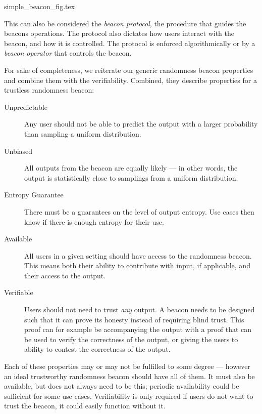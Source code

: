 {simple_beacon_fig.tex}

This can also be considered the \emph{beacon protocol}, the procedure that guides the beacons operations.
The protocol also dictates how users interact with the beacon, and how it is controlled.
The protocol is enforced algorithmically or by a \emph{beacon operator} that controls the beacon.

For sake of completeness, we reiterate our generic randomness beacon properties and combine them with the verifiability.
Combined, they describe properties for a trustless randomness beacon:

\begin{description}
    \item[Unpredictable]
        Any user should not be able to predict the output with a larger probability than sampling a uniform distribution. 
    \item[Unbiased]
        All outputs from the beacon are equally likely --- in other words, the output is statistically close to samplings from a uniform distribution. 
    \item[Entropy Guarantee]
        There must be a guarantees on the level of output entropy.
Use cases then know if there is enough entropy for their use.
    \item[Available]
        All users in a given setting should have access to the randomness beacon.
        This means both their ability to contribute with input, if applicable, and their access to the output.
    \item[Verifiable]
        Users should not need to trust \emph{any} output.
        A beacon needs to be designed such that it can prove its honesty instead of requiring blind trust.
        This proof can for example be accompanying the output with a proof that can be used to verify the correctness of the output, or giving the users to ability to contest the correctness of the output.
\end{description}

Each of these properties may or may not be fulfilled to some degree --- however an ideal trustworthy randomness beacon should have all of them.%
It must also be available, but does not always need to be this; periodic availability could be sufficient for some use cases.
Verifiability is only required if users do not want to trust the beacon, it could easily function without it.

